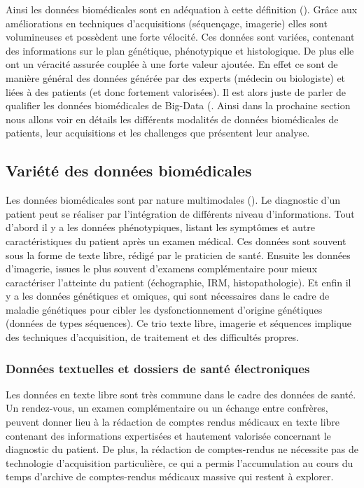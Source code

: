 Ainsi les données biomédicales sont en adéquation à cette définition (\cite{zheng_application_2021}). Grâce aux améliorations en techniques d'acquisitions (séquençage, imagerie) elles sont volumineuses et possèdent une forte vélocité. Ces données sont variées, contenant des informations sur le plan génétique, phénotypique et histologique. De plus elle ont un véracité assurée couplée à une forte valeur ajoutée. En effet ce sont de manière général des données générée par des experts (médecin ou biologiste) et liées à des patients (et donc fortement valorisées). Il est alors juste de parler de qualifier les données biomédicales de Big-Data (\cite{sonawane_network_2019}. Ainsi dans la prochaine section nous allons voir en détails les différents modalités de données biomédicales de patients, leur acquisitions et les challenges que présentent leur analyse.

\subsection{Variété des données biomédicales}
Les données biomédicales sont par nature multimodales (\cite{acosta_multimodal_2022}). Le diagnostic d'un patient peut se réaliser par l'intégration de différents niveau d'informations. Tout d'abord il y a les données phénotypiques, listant les symptômes et autre caractéristiques du patient après un examen médical. Ces données sont souvent sous la forme de texte libre, rédigé par le praticien de santé. Ensuite les données d'imagerie, issues le plus souvent d'examens complémentaire pour mieux caractériser l'atteinte du patient (échographie, IRM, histopathologie). Et enfin il y a les données génétiques et omiques, qui sont nécessaires dans le cadre de maladie génétiques pour cibler les dysfonctionnement d'origine génétiques (données de types séquences). Ce trio texte libre, imagerie et séquences implique des techniques d'acquisition, de traitement et des difficultés propres.

\subsubsection{Données textuelles et dossiers de santé électroniques}
Les données en texte libre sont très commune dans le cadre des données de santé. Un rendez-vous, un examen complémentaire ou un échange entre confrères, peuvent donner lieu à la rédaction de comptes rendus médicaux en texte libre contenant des informations expertisées et hautement valorisée concernant le diagnostic du patient. De plus, la rédaction de comptes-rendus ne nécessite pas de technologie d'acquisition particulière, ce qui a permis l'accumulation au cours du temps d'archive de comptes-rendus médicaux massive qui restent à explorer.

